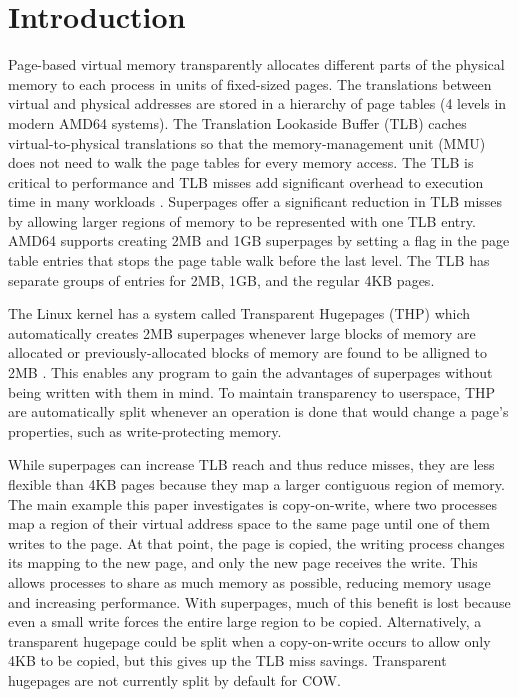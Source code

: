 \chapter{Introduction}

Page-based virtual memory transparently allocates different parts of the physical memory to each process in units of fixed-sized pages. The translations between virtual and physical addresses are stored in a hierarchy of page tables (4 levels in modern AMD64 systems). The Translation Lookaside Buffer (TLB) caches virtual-to-physical translations so that the memory-management unit (MMU) does not need to walk the page tables for every memory access. The TLB is critical to performance and TLB misses add significant overhead to execution time in many workloads \cite{Barr}. Superpages offer a significant reduction in TLB misses by allowing larger regions of memory to be represented with one TLB entry. AMD64 supports creating 2MB and 1GB superpages by setting a flag in the page table entries that stops the page table walk before the last level. The TLB has separate groups of entries for 2MB, 1GB, and the regular 4KB pages.

The Linux kernel has a system called Transparent Hugepages (THP) which automatically creates 2MB superpages whenever large blocks of memory are allocated or previously-allocated blocks of memory are found to be alligned to 2MB \cite{THP}. This enables any program to gain the advantages of superpages without being written with them in mind. To maintain transparency to userspace, THP are automatically split whenever an operation is done that would change a page's properties, such as write-protecting memory.

While superpages can increase TLB reach and thus reduce misses, they are less flexible than 4KB pages because they map a larger contiguous region of memory. The main example this paper investigates is copy-on-write, where two processes map a region of their virtual address space to the same page until one of them writes to the page. At that point, the page is copied, the writing process changes its mapping to the new page, and only the new page receives the write. This allows processes to share as much memory as possible, reducing memory usage and increasing performance. With superpages, much of this benefit is lost because even a small write forces the entire large region to be copied. Alternatively, a transparent hugepage could be split when a copy-on-write occurs to allow only 4KB to be copied, but this gives up the TLB miss savings. Transparent hugepages are not currently split by default for COW.

